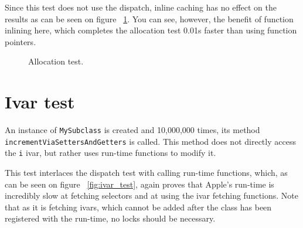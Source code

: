 Since this test does not use the dispatch, inline caching has no effect on the results as can be seen on figure ~\ref{fig:alloc_test}. You can see, however, the benefit of function inlining here, which completes the allocation test 0.01s faster than using function pointers.

\begin{figure}[H]
  \centering{}
  \caption{Allocation test.}
  \label{fig:alloc_test}
\end{figure}


\section{Ivar test}

An instance of \verb=MySubclass= is created and 10,000,000 times, its method \verb=incrementViaSettersAndGetters= is called. This method does not directly access the \verb=i= ivar, but rather uses run-time functions to modify it.

This test interlaces the dispatch test with calling run-time functions, which, as can be seen on figure ~\ref{fig:ivar_test}, again proves that Apple's run-time is incredibly slow at fetching selectors and at using the ivar fetching functions. Note that as it is fetching ivars, which cannot be added after the class has been registered with the run-time, no locks should be necessary.

